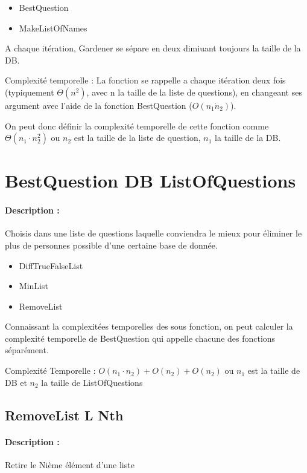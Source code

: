 \documentclass[10pt,a4paper]{article}
\begin{document}
\begin{itemize}
\item BestQuestion
\item MakeListOfNames
\end{itemize}

A chaque itération, Gardener se sépare en deux dimiuant toujours la taille de la DB.

Complexité temporelle : La fonction se rappelle a chaque itération deux fois (typiquement $\Theta(n^2)$, avec n la taille de la liste de questions), en changeant ses argument avec l'aide de la fonction BestQuestion ($O(n_1 \dot n_2)$).

On peut donc définir la complexité temporelle de cette fonction comme $\Theta(n_1 \cdot n_2^2)$ ou $n_2$ est la taille de la liste de question, $n_1$ la taille de la DB.

\section{BestQuestion DB ListOfQuestions}
\paragraph{Description :} Choisis dans une liste de questions laquelle conviendra le mieux pour éliminer le plus de personnes possible d'une certaine base de donnée.

\begin{itemize}
\item DiffTrueFalseList
\item MinList
\item RemoveList
\end{itemize}

Connaissant la complexitées temporelles des sous fonction, on peut calculer la complexité temporelle de BestQuestion qui appelle chacune des fonctions séparément.

Complexité Temporelle : $O(n_1 \cdot n_2) + O(n_2) + O(n_2)$ ou $n_1$ est la taille de DB et $n_2$ la taille de ListOfQuestions

\subsection{RemoveList L Nth}
\paragraph{Description :} Retire le Nième élément d'une liste
\end{document}
